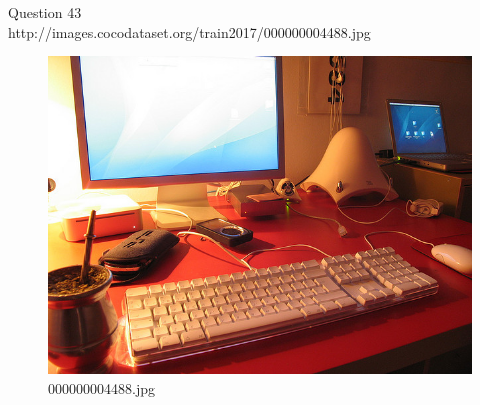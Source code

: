 Question 43\\
http://images.cocodataset.org/train2017/000000004488.jpg
\begin{figure}[h]
    \centering
    \includegraphics[width=0.8\linewidth]{../image set/hard/000000004488.jpg}
    \caption{000000004488.jpg}
\end{figure}
